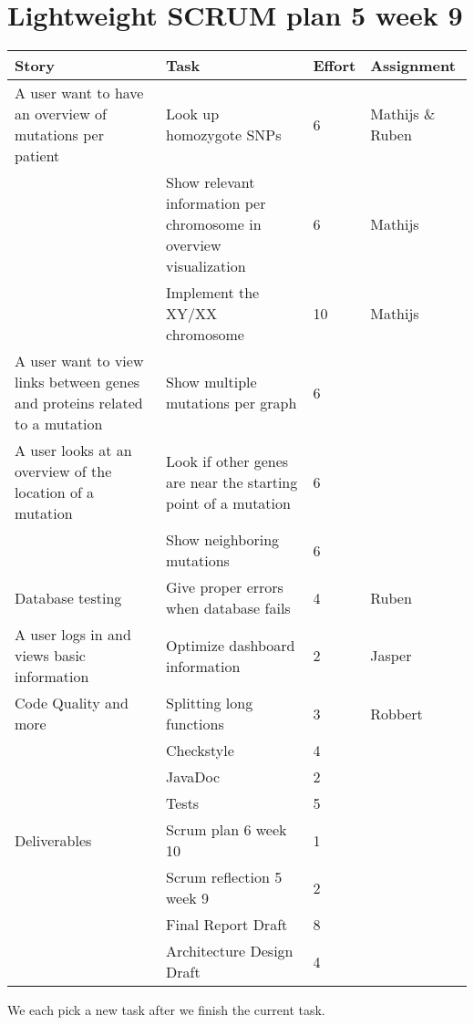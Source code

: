 \documentclass[a4paper]{report}
\begin{document}


\section*{Lightweight SCRUM plan 5 week 9}

\setlength\extrarowheight{5pt}
\begin{table}[ht]
\begin{tabular}{p{5cm}|p{5cm}|p{1cm}|p{2cm}}

\textbf{Story} & \textbf{Task} & \textbf{Effort} & \textbf{Assignment}\\
\hline \hline

A user want to have an overview of mutations per patient
& Look up homozygote SNPs & 6 & Mathijs \& Ruben\\
& Show relevant information per chromosome in overview visualization & 6 & Mathijs\\
& Implement the XY/XX chromosome & 10 & Mathijs\\
\hline

A user want to view links between genes and proteins related to a mutation 
& Show multiple mutations per graph & 6 & \\
\hline

A user looks at an overview of the location of a mutation 
& Look if other genes are near the starting point of a mutation & 6 &\\
& Show neighboring mutations & 6 &\\
\hline

Database testing 
& Give proper errors when database fails & 4 & Ruben\\
\hline

A user logs in and views basic information 
& Optimize dashboard information & 2 & Jasper\\
\hline

Code Quality and more 
& Splitting long functions & 3 & Robbert \\
& Checkstyle & 4 & \\
& JavaDoc & 2 & \\
& Tests & 5 & \\
\hline

Deliverables 
& Scrum plan 6 week 10 & 1 &\\
& Scrum reflection 5 week 9 & 2 &\\
& Final Report Draft & 8 &\\
& Architecture Design Draft & 4 &\\
\hline
\end{tabular}
\end{table}

We each pick a new task after we finish the current task.
\end{document}
